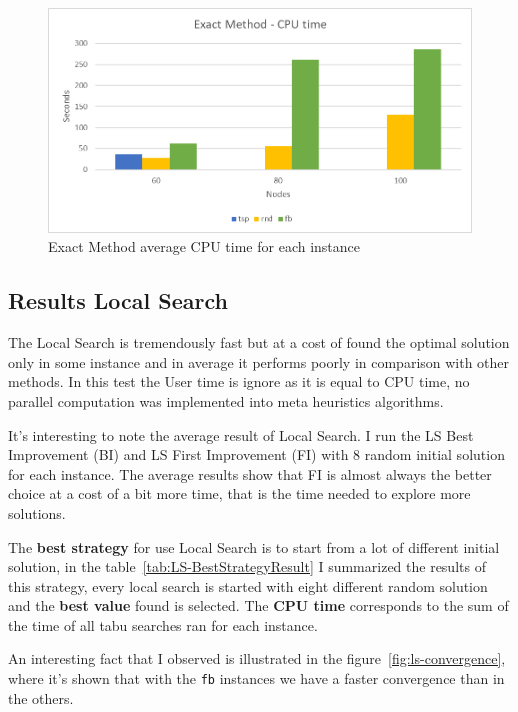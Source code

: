 	
	\begin{figure} [hb]
		\centering
		\includegraphics[width=\linewidth]{img/EM-results-time}
		\caption{Exact Method average CPU time for each instance}
		\label{fig:em-results-time}
	\end{figure}
	
	
	
\newpage
\subsection{Results Local Search}
\label{subsec:results-ls}
	The Local Search is tremendously fast but at a cost of found the optimal solution only in some instance and in average it performs poorly in comparison with other methods. In this test the User time is ignore as it is equal to CPU time, no parallel computation was implemented into meta heuristics algorithms.

	It's interesting to note the average result of Local Search. I run the LS Best Improvement (BI) and LS First Improvement (FI) with 8 random initial solution for each instance. The average results show that FI is almost always the better choice at a cost of a bit more time, that is the time needed to explore more solutions.
	
	The \textbf{best strategy} for use Local Search is to start from a lot of different initial solution, in the table~\ref{tab:LS-BestStrategyResult} I summarized the results of this strategy, every local search is started with eight different random solution and the \textbf{best value} found is selected. The \textbf{CPU time} corresponds to the sum of the time of all tabu searches ran for each instance.
	
	An interesting fact that I observed is illustrated in the figure~\ref{fig:ls-convergence}, where it's shown that with the \verb|fb| instances we have a faster convergence than in the others.
	
